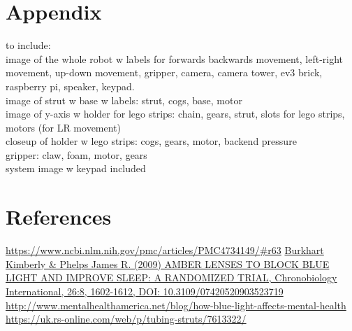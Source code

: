 \documentclass[onecolumn]{IEEEtran}
\begin{document}
\section{Appendix}
to include:\\
image of the whole robot w labels for forwards backwards movement, left-right movement, up-down movement, gripper, camera, camera tower, ev3 brick, raspberry pi, speaker, keypad. \\
image of strut w base w labels: strut, cogs, base, motor\\
image of y-axis w holder for lego strips: chain, gears, strut, slots for lego strips, motors (for LR movement)\\
closeup of holder w lego strips: cogs, gears, motor, backend pressure\\
gripper: claw, foam, motor, gears\\
system image w keypad included \\

\section{References}
\noindent [1] \href{https://www.ncbi.nlm.nih.gov/pmc/articles/PMC4734149/\#r63}{https://www.ncbi.nlm.nih.gov/pmc/articles/PMC4734149/\#r63} \newline
[2] \href{https://www.tandfonline.com/doi/abs/10.3109/07420520903523719?casa_token=xuj5yeT4EWEAAAAA\%3ADS5C1NhfiI1XBogq05OfmNmXPNALfdGdCkl8oOSUKUsNgLJZQW5dzziJ_a5yXX3H1YCVc57m8jc\&}{Burkhart Kimberly \& Phelps James R. (2009) AMBER LENSES TO BLOCK BLUE LIGHT AND IMPROVE SLEEP: A RANDOMIZED TRIAL, Chronobiology International, 26:8, 1602-1612, DOI: 10.3109/07420520903523719} \newline
[3] \href{http://www.mentalhealthamerica.net/blog/how-blue-light-affects-mental-health}{http://www.mentalhealthamerica.net/blog/how-blue-light-affects-mental-health} \newline
[4]\href{https://uk.rs-online.com/web/p/tubing-struts/7613322/}{https://uk.rs-online.com/web/p/tubing-struts/7613322/}
\end{document}
